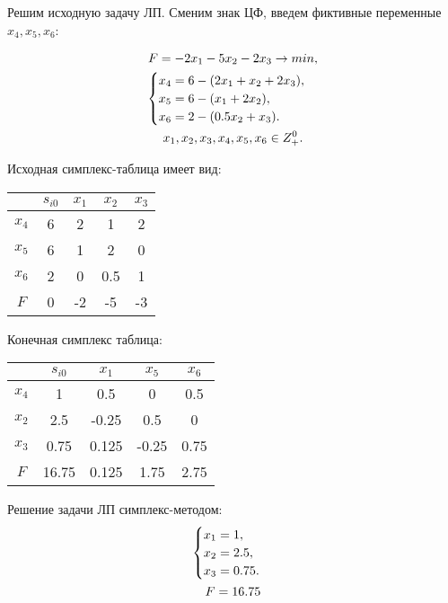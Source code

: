 \documentclass[12pt,a4paper,oneside]{extarticle}
\begin{document}
    Решим исходную задачу ЛП. Сменим знак ЦФ, введем фиктивные переменные $x_4, x_5, x_6$:

    \begin{gather}
        F = -2x_1-5x_2-2x_3 \rightarrow min,  \notag  \\
        \begin{cases}
            x_4 = 6 - (2x_1 + x_2 + 2x_3), \\
            x_5 = 6 - (x_1 + 2x_2),\\
            x_6 = 2 - (0.5x_2 + x_3).
        \end{cases} 
        \notag \\
        x_1, x_2, x_3, x_4, x_5, x_6 \in Z^0_+. \notag
    \end{gather}

    Исходная симплекс-таблица имеет вид:
    \begin{center}
        \begin{tabular}{|c|c|c|c|c|}
            \hline
                 & $s_{i0}$ & $x_1$ & $x_2$ & $x_3$ \\ \hline
            $x_4$ & 6       & 2     & 1     & 2 \\ \hline
            $x_5$ & 6       & 1     & 2     & 0 \\ \hline
            $x_6$ & 2       & 0     & 0.5   & 1 \\ \hline
            $F$   & 0       & -2    & -5    & -3 \\ \hline
        \end{tabular}
    \end{center}

    Конечная симплекс таблица:     
    \begin{center}
        \begin{tabular}{|c|c|c|c|c|}
            \hline
                 & $s_{i0}$ & $x_1$   & $x_5$   & $x_6$ \\ \hline
            $x_4$ & 1       & 0.5     & 0       & 0.5     \\ \hline
            $x_2$ & 2.5     & -0.25   & 0.5     & 0     \\ \hline
            $x_3$ & 0.75    & 0.125   & -0.25   & 0.75  \\ \hline
            $F$   & 16.75   & 0.125   & 1.75    & 2.75  \\ \hline
        \end{tabular}
    \end{center}

    Решение задачи ЛП симплекс-методом:
    \begin{gather}
        \begin{cases}
            x_1 = 1,\\
            x_2 = 2.5, \\
            x_3 = 0.75. \\
        \end{cases} \notag \\
        F = 16.75 \notag 
    \end{gather}
\end{document}
